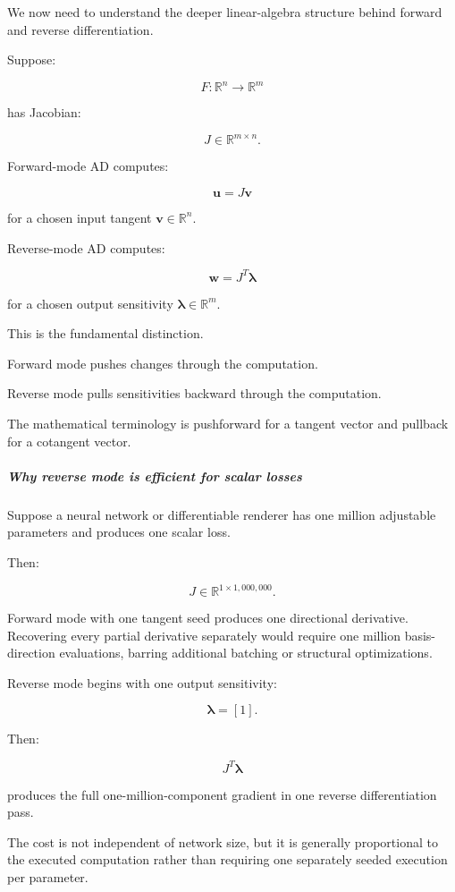 We now need to understand the deeper linear-algebra structure behind forward and reverse differentiation.

Suppose:

\[
F:\mathbb R^n\rightarrow\mathbb R^m
\]

has Jacobian:

\[
J\in\mathbb R^{m\times n}.
\]

Forward-mode AD computes:

\[
\boxed{\mathbf u=J\mathbf v}
\]

for a chosen input tangent \(\mathbf v\in\mathbb R^n\).

Reverse-mode AD computes:

\[
\boxed{\mathbf w=J^T\boldsymbol\lambda}
\]

for a chosen output sensitivity \(\boldsymbol\lambda\in\mathbb R^m\).

This is the fundamental distinction.

Forward mode pushes changes through the computation.

Reverse mode pulls sensitivities backward through the computation.

The mathematical terminology is pushforward for a tangent vector and pullback for a cotangent vector.

\subparagraph{Why reverse mode is efficient for scalar losses}\label{why-reverse-mode-is-efficient-for-scalar-losses}

Suppose a neural network or differentiable renderer has one million adjustable parameters and produces one scalar loss.

Then:

\[
J\in\mathbb R^{1\times1{,}000{,}000}.
\]

Forward mode with one tangent seed produces one directional derivative. Recovering every partial derivative separately would require one million basis-direction evaluations, barring additional batching or structural optimizations.

Reverse mode begins with one output sensitivity:

\[
\boldsymbol\lambda=[1].
\]

Then:

\[
J^T\boldsymbol\lambda
\]

produces the full one-million-component gradient in one reverse differentiation pass.

The cost is not independent of network size, but it is generally proportional to the executed computation rather than requiring one separately seeded execution per parameter.

